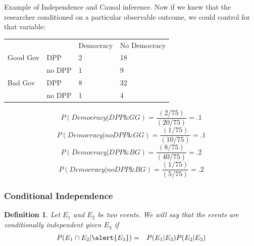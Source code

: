 \documentclass{beamer}
\newtheorem{defn}{Definition}
\numberwithin{equation}{section}
\begin{document}
\begin{frame}{Example of Independence and Causal inference.}
Now if we knew that the researcher conditioned on a particular observable outcome, we could control for that variable:\pause

\begin{table}
\begin{tabular}{llll}
		&&Democracy& No Democracy\\
 Good Gov & DPP &2 & 18\\
		 &no DPP & 1& 9\\
		 \hline
Bad Gov  & DPP &8 & 32\\
		&no DPP & 1& 4\\



\end{tabular}
\end{table}
\pause
$$P(Democracy| DPP\& GG)= \frac{(2/75)}{( 20/75)} = .1$$
$$P(Democracy| no DPP\& GG)=  \frac{(1/75)}{(10/75)} = .1$$
\pause
$$P(Democracy| DPP\& BG)= \frac{(8/75)}{( 40/75)} = .2$$
$$P(Democracy| no DPP\& BG)=  \frac{(1/75)}{(5/75)} = .2$$
 \end{frame}




\begin{frame}
\frametitle{Conditional  Independence}

\begin{defn}
Let $E_{1}$ and $E_{2}$ be two events.  We will say that the events are conditionally independent given $E_{3}$ if 
\begin{eqnarray}
P(E_{1} \cap E_{2} | \alert{E_{3}}) & = & P(E_{1} | E_{3} ) P(E_{2} | E_{3} ) \nonumber 
\end{eqnarray}


\end{defn}



\end{frame}
\end{document}
